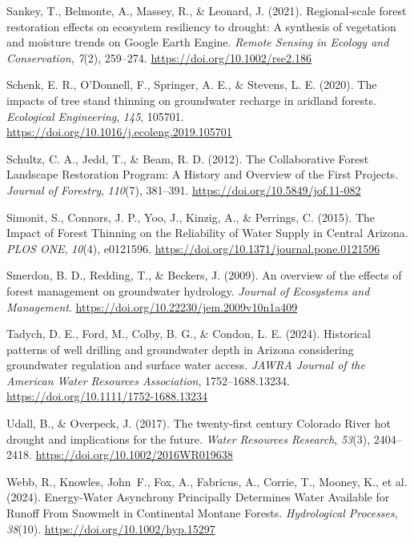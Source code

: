 \documentclass[
]{agujournal2019}
\newlength{\cslhangindent}
\newenvironment{CSLReferences}[2] %
 {\begin{list}{}{%
  \setlength{\itemindent}{0pt}
  \setlength{\leftmargin}{0pt}
  \setlength{\parsep}{0pt}
  \ifodd #1
   \setlength{\leftmargin}{\cslhangindent}
   \setlength{\itemindent}{-1\cslhangindent}
  \fi
  \setlength{\itemsep}{#2\baselineskip}}}
 {\end{list}}
\begin{document}
\begin{CSLReferences}{1}{0}
Sankey, T., Belmonte, A., Massey, R., \& Leonard, J. (2021).
Regional‐scale forest restoration effects on ecosystem resiliency to
drought: A synthesis of vegetation and moisture trends on {Google}
{Earth} {Engine}. \emph{Remote Sensing in Ecology and Conservation},
\emph{7}(2), 259--274. \url{https://doi.org/10.1002/rse2.186}

Schenk, E. R., O'Donnell, F., Springer, A. E., \& Stevens, L. E. (2020).
The impacts of tree stand thinning on groundwater recharge in aridland
forests. \emph{Ecological Engineering}, \emph{145}, 105701.
\url{https://doi.org/10.1016/j.ecoleng.2019.105701}

Schultz, C. A., Jedd, T., \& Beam, R. D. (2012). The {Collaborative}
{Forest} {Landscape} {Restoration} {Program}: {A} {History} and
{Overview} of the {First} {Projects}. \emph{Journal of Forestry},
\emph{110}(7), 381--391. \url{https://doi.org/10.5849/jof.11-082}

Simonit, S., Connors, J. P., Yoo, J., Kinzig, A., \& Perrings, C.
(2015). The {Impact} of {Forest} {Thinning} on the {Reliability} of
{Water} {Supply} in {Central} {Arizona}. \emph{PLOS ONE}, \emph{10}(4),
e0121596. \url{https://doi.org/10.1371/journal.pone.0121596}

Smerdon, B. D., Redding, T., \& Beckers, J. (2009). An overview of the
effects of forest management on groundwater hydrology. \emph{Journal of
Ecosystems and Management}.
\url{https://doi.org/10.22230/jem.2009v10n1a409}

Tadych, D. E., Ford, M., Colby, B. G., \& Condon, L. E. (2024).
Historical patterns of well drilling and groundwater depth in {Arizona}
considering groundwater regulation and surface water access. \emph{JAWRA
Journal of the American Water Resources Association}, 1752--1688.13234.
\url{https://doi.org/10.1111/1752-1688.13234}

Udall, B., \& Overpeck, J. (2017). The twenty‐first century {Colorado}
{River} hot drought and implications for the future. \emph{Water
Resources Research}, \emph{53}(3), 2404--2418.
\url{https://doi.org/10.1002/2016WR019638}

Webb, R., Knowles, John~F., Fox, A., Fabricus, A., Corrie, T., Mooney,
K., et al. (2024). Energy{-}Water Asynchrony Principally Determines
Water Available for Runoff From Snowmelt in Continental Montane Forests.
\emph{Hydrological Processes}, \emph{38}(10).
\url{https://doi.org/10.1002/hyp.15297}


\end{CSLReferences}
\end{document}
